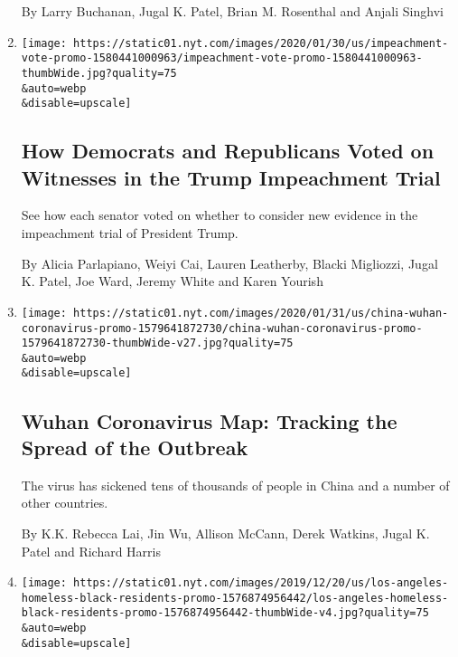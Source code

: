 \begin{enumerate}
  By Larry Buchanan, Jugal K. Patel, Brian M. Rosenthal and Anjali
  Singhvi
\item
  \href{/interactive/2020/01/31/us/politics/impeachment-vote.html}{}

  \texttt{[image: https://static01.nyt.com/images/2020/01/30/us/impeachment-vote-promo-1580441000963/impeachment-vote-promo-1580441000963-thumbWide.jpg?quality=75\\\&auto=webp\\\&disable=upscale]}

  \hypertarget{how-democrats-and-republicans-voted-on-witnesses-in-the-trump-impeachment-trial}{%
  \subsection{How Democrats and Republicans Voted on Witnesses in the
  Trump Impeachment
  Trial}\label{how-democrats-and-republicans-voted-on-witnesses-in-the-trump-impeachment-trial}}

  See how each senator voted on whether to consider new evidence in the
  impeachment trial of President Trump.

  By Alicia Parlapiano, Weiyi Cai, Lauren Leatherby, Blacki Migliozzi,
  Jugal K. Patel, Joe Ward, Jeremy White and Karen Yourish
\item
  \href{/interactive/2020/01/21/world/asia/china-coronavirus-maps.html}{}

  \texttt{[image: https://static01.nyt.com/images/2020/01/31/us/china-wuhan-coronavirus-promo-1579641872730/china-wuhan-coronavirus-promo-1579641872730-thumbWide-v27.jpg?quality=75\\\&auto=webp\\\&disable=upscale]}

  \hypertarget{wuhan-coronavirus-map-tracking-the-spread-of-the-outbreak}{%
  \subsection{Wuhan Coronavirus Map: Tracking the Spread of the
  Outbreak}\label{wuhan-coronavirus-map-tracking-the-spread-of-the-outbreak}}

  The virus has sickened tens of thousands of people in China and a
  number of other countries.

  By K.K. Rebecca Lai, Jin Wu, Allison McCann, Derek Watkins, Jugal K.
  Patel and Richard Harris
\item
  \href{/interactive/2019/12/22/us/los-angeles-homeless-black-residents.html}{}

  \texttt{[image: https://static01.nyt.com/images/2019/12/20/us/los-angeles-homeless-black-residents-promo-1576874956442/los-angeles-homeless-black-residents-promo-1576874956442-thumbWide-v4.jpg?quality=75\\\&auto=webp\\\&disable=upscale]}


\end{enumerate}
